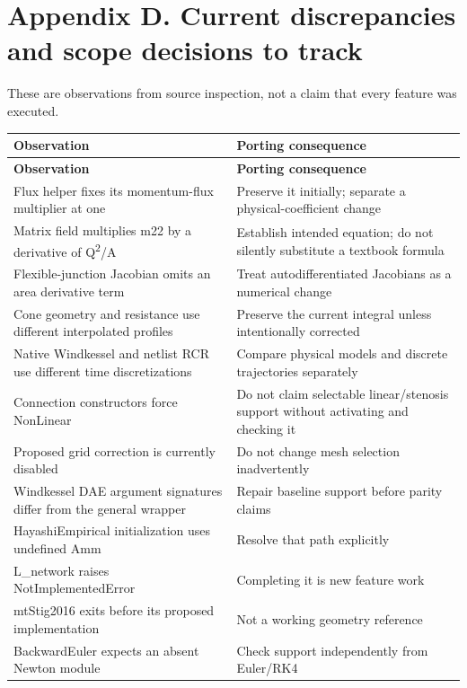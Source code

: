 \documentclass[11pt,a4paper]{article}
\begin{document}
\section{Appendix D. Current discrepancies and scope decisions to track}
These are observations from source inspection, not a claim that every feature was executed.


\begingroup\footnotesize
\setlength{\tabcolsep}{4pt}
\begin{longtable}{>{\raggedright\arraybackslash}p{}>{\raggedright\arraybackslash}p{}}
\toprule
\textbf{Observation} & \textbf{Porting consequence} \\
\midrule
\endfirsthead
\textbf{Observation} & \textbf{Porting consequence} \\
\midrule
\endhead
\bottomrule
\endfoot
Flux helper fixes its momentum-flux multiplier at one & Preserve it initially; separate a physical-coefficient change \\
Matrix field multiplies m22 by a derivative of Q\textsuperscript{2}/A & Establish intended equation; do not silently substitute a textbook formula \\
Flexible-junction Jacobian omits an area derivative term & Treat autodifferentiated Jacobians as a numerical change \\
Cone geometry and resistance use different interpolated profiles & Preserve the current integral unless intentionally corrected \\
Native Windkessel and netlist RCR use different time discretizations & Compare physical models and discrete trajectories separately \\
Connection constructors force NonLinear & Do not claim selectable linear/stenosis support without activating and checking it \\
Proposed grid correction is currently disabled & Do not change mesh selection inadvertently \\
Windkessel DAE argument signatures differ from the general wrapper & Repair baseline support before parity claims \\
HayashiEmpirical initialization uses undefined Amm & Resolve that path explicitly \\
L\_network raises NotImplementedError & Completing it is new feature work \\
mtStig2016 exits before its proposed implementation & Not a working geometry reference \\
BackwardEuler expects an absent Newton module & Check support independently from Euler/RK4 \\

\end{longtable}
\end{document}
